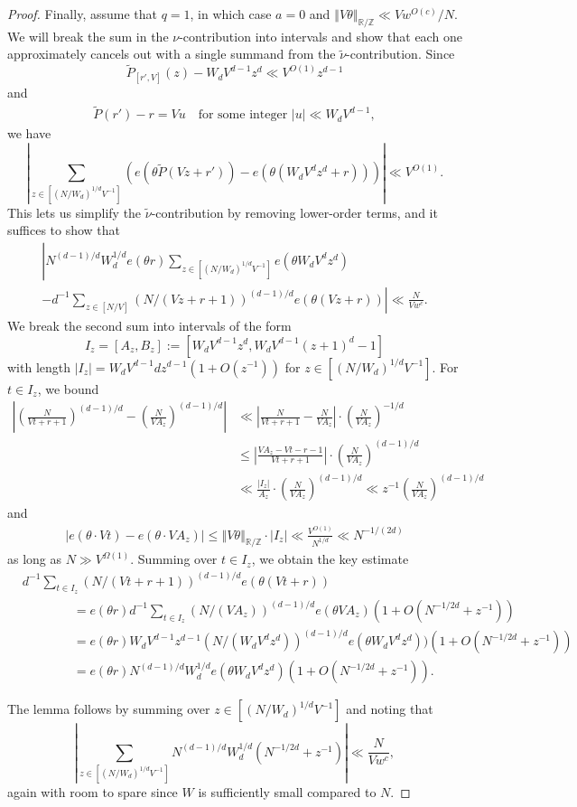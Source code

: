 \documentclass[11pt]{amsart}
\theoremstyle{definition}
\newcommand{\R}{{\mathbb R}}
\newcommand{\Z}{{\mathbb Z}}
\newcommand{\norm}[1]{\left\Vert #1\right\Vert}
\newcommand{\abs}[1]{\mathopen{}\left| #1\mathclose{}\right|}
\newcommand{\brac}[1]{\mathopen{}\left( #1 \mathclose{}\right)}
\begin{document}
\begin{proof}
Finally, assume that $q=1$, in which case $a=0$ and $\norm{V\theta}_{\mathbb{R}/\mathbb{Z}} \ll Vw^{O(c)}/N$.  We will break the sum in the $ \nu$-contribution into intervals and show that each one approximately cancels out with a single summand from the $\tilde\nu$-contribution.  Since
$$\widetilde P_{[r',V]}(z)-W_d V^{d-1} z^d \ll V^{O(1)} z^{d-1}$$
and
\begin{align*}
    \widetilde P(r') - r = Vu\quad \textrm{for some integer  } |u|\ll W_d V^{d-1},
\end{align*}
we have
$$\abs{\sum_{z \in [(N/W_d)^{1/d}V^{-1}]} (e(\theta\widetilde P(Vz+r'))-e(\theta (W_d V^{d} z^d + r)))} \ll V^{O(1)}.$$
This lets us simplify the $\tilde{\nu}$-contribution by removing lower-order terms, and it suffices to show that
\begin{multline*}
\left|N^{(d-1)/d}W_d^{1/d} e(\theta r)\sum_{z \in [(N/W_d)^{1/d}V^{-1}]} e(\theta W_d V^{d} z^d)\right.\\
\left.-d^{-1}\sum_{z \in [N/V]} (N/(Vz+r+1))^{(d-1)/d}e(\theta(Vz+r))\right|\ll \frac{N}{V w^c}.  
\end{multline*}
We break the second sum into intervals of the form $$I_z = [A_z, B_z]:=[W_d V^{d-1} z^d,W_d V^{d-1} (z+1)^d-1]$$
with length $|I_z|=W_d V^{d-1}dz^{d-1}(1+O(z^{-1}))$ for $z\in[(N/W_d)^{1/d}V^{-1}]$. For $t\in I_z$, we bound
\begin{align*}
    \abs{\brac{\frac{N}{Vt+r+1}}^{(d-1)/d} - \brac{\frac{N}{V A_z}}^{(d-1)/d}}&\ll \abs{\frac{N}{Vt+r+1} - \frac{N}{V A_z}} \cdot\brac{\frac{N}{V A_z}}^{-1/d}\\
    &\leq \abs{\frac{V A_z - Vt -r-1}{Vt+r+1}} \cdot\brac{\frac{N}{V A_z}}^{(d-1)/d}\\
    &\ll \frac{|I_z|}{A_z}\cdot\brac{\frac{N}{V A_z}}^{(d-1)/d} \ll z^{-1}\brac{\frac{N}{V A_z}}^{(d-1)/d}
\end{align*}
and
\begin{align}\label{E: comparison of sums}
    \abs{e(\theta \cdot Vt) - e(\theta\cdot VA_z)}\leq\norm{V\theta}_{\R/\Z} \cdot |I_z|\ll \frac{V^{O(1)}}{N^{1/d}}\ll N^{-1/(2d)}
\end{align}
as long as $N\gg V^{\Omega(1)}$.  Summing over $t \in I_z$, we obtain the key estimate
\begin{align*}
& d^{-1}\sum_{t \in I_z} (N/(Vt+r+1))^{(d-1)/d}e(\theta(Vt+r))\\
&\qquad \qquad =e(\theta r) d^{-1}\sum_{t \in I_z} (N/(VA_z))^{(d-1)/d}e(\theta V A_z )(1+O(N^{-1/2d}+z^{-1}))\\
&\qquad \qquad =e(\theta r) W_d V^{d-1} z^{d-1} (N/(W_d V^{d} z^d))^{(d-1)/d}e(\theta W_d V^{d} z^d))(1+O(N^{-1/2d}+z^{-1}))\\
&\qquad \qquad =e(\theta r) N^{(d-1)/d} W_d^{1/d}e(\theta W_d V^{d} z^d) (1+O(N^{-1/2d}+z^{-1})).
\end{align*}

The lemma follows by summing over $z \in [(N/W_d)^{1/d}V^{-1}]$ and noting that
$$\abs{\sum_{z \in [(N/W_d)^{1/d}V^{-1}]}N^{(d-1)/d} W_d^{1/d}(N^{-1/2d}+z^{-1})} \ll \frac{N}{V w^c},$$
again with room to spare since $W$ is sufficiently small compared to $N$.
\end{proof}
\end{document}
